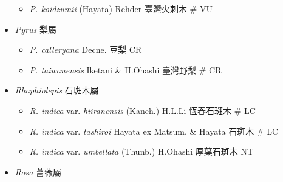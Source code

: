 \begin{itemize}
  \begin{itemize}
        \item[] \textit{P. koidzumii} (Hayata) Rehder  臺灣火刺木  \# VU
  \end{itemize}
 \item[] \textit{Pyrus} 梨屬
                                
  \begin{itemize}
        \item[] \textit{P. calleryana} Decne.  豆梨   CR
        \item[] \textit{P. taiwanensis} Iketani \& H.Ohashi  臺灣野梨  \# CR
  \end{itemize}
 \item[] \textit{Rhaphiolepis} 石斑木屬
                                
  \begin{itemize}
        \item[] \textit{R. indica} var. \textit{hiiranensis} (Kaneh.) H.L.Li  恆春石斑木  \# LC
        \item[] \textit{R. indica} var. \textit{tashiroi} Hayata ex Matsum. \& Hayata  石斑木  \# LC
        \item[] \textit{R. indica} var. \textit{umbellata} (Thunb.) H.Ohashi  厚葉石斑木   NT
  \end{itemize}
 \item[] \textit{Rosa} 薔薇屬
                                

\end{itemize}
